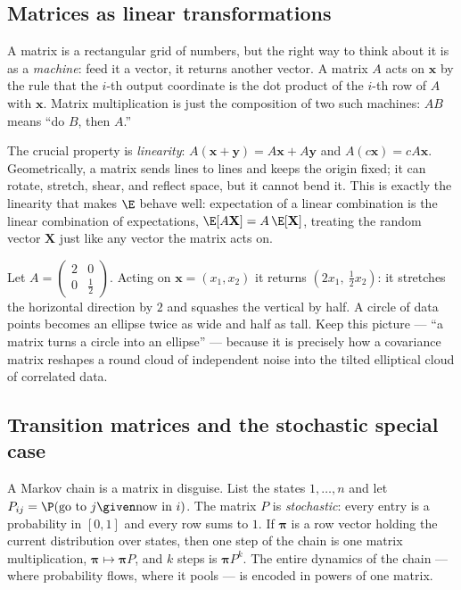 \subsection{Matrices as linear transformations}
\label{chAcla:matrices}

A matrix is a rectangular grid of numbers, but the right way to think about it is as a \emph{machine}:
feed it a vector, it returns another vector. A matrix $A$ acts on $\mathbf{x}$ by the rule that the
$i$-th output coordinate is the dot product of the $i$-th row of $A$ with $\mathbf{x}$. Matrix
multiplication is just the composition of two such machines: $AB$ means ``do $B$, then $A$.''

The crucial property is \emph{linearity}: $A(\mathbf{x}+\mathbf{y})=A\mathbf{x}+A\mathbf{y}$ and
$A(c\mathbf{x})=cA\mathbf{x}$. Geometrically, a matrix sends lines to lines and keeps the origin
fixed; it can rotate, stretch, shear, and reflect space, but it cannot bend it. This is exactly the
linearity that makes $\E$ behave well: expectation of a linear combination is the linear combination
of expectations, $\E[A\mathbf{X}] = A\,\E[\mathbf{X}]$, treating the random vector $\mathbf{X}$ just
like any vector the matrix acts on.

\begin{example}
\label{chAcla:ex-matrix-action}
Let $A=\begin{pmatrix} 2 & 0 \\ 0 & \tfrac12 \end{pmatrix}$. Acting on $\mathbf{x}=(x_1,x_2)$ it
returns $(2x_1,\ \tfrac12 x_2)$: it stretches the horizontal direction by $2$ and squashes the
vertical by half. A circle of data points becomes an ellipse twice as wide and half as tall. Keep
this picture --- ``a matrix turns a circle into an ellipse'' --- because it is precisely how a
covariance matrix reshapes a round cloud of independent noise into the tilted elliptical cloud of
correlated data.
\end{example}

\subsection{Transition matrices and the stochastic special case}
\label{chAcla:transition}

A Markov chain is a matrix in disguise. List the states $1,\dots,n$ and let $P_{ij}=\P(\text{go to }j
\given \text{now in }i)$. The matrix $P$ is \emph{stochastic}: every entry is a probability in
$[0,1]$ and every row sums to $1$. If $\boldsymbol\pi$ is a row vector holding the current
distribution over states, then one step of the chain is one matrix multiplication, $\boldsymbol\pi
\mapsto \boldsymbol\pi P$, and $k$ steps is $\boldsymbol\pi P^k$. The entire dynamics of the chain ---
where probability flows, where it pools --- is encoded in powers of one matrix.

